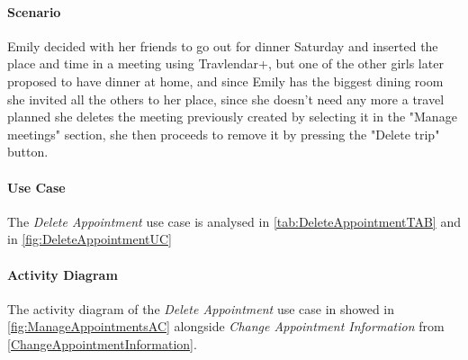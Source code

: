 \paragraph*{Scenario\\}
Emily decided with her friends to go out for dinner Saturday and inserted the place and time in a meeting using Travlendar+, but one of the other girls later proposed to have dinner at home, and since Emily has the biggest dining room she invited all the others to her place, since she doesn't need any more a travel planned she deletes the meeting previously created by selecting it in the "Manage meetings" section, she then proceeds to remove it by pressing the "Delete trip" button.
\paragraph*{Use Case\\}
The \emph{Delete Appointment} use case is analysed in \autoref{tab:DeleteAppointmentTAB} and in \autoref{fig:DeleteAppointmentUC}
\paragraph*{Activity Diagram\\}
The activity diagram of the \emph{Delete Appointment} use case in showed in \autoref{fig:ManageAppointmentsAC} alongside \emph{Change Appointment Information} from \autoref{ChangeAppointmentInformation}.

